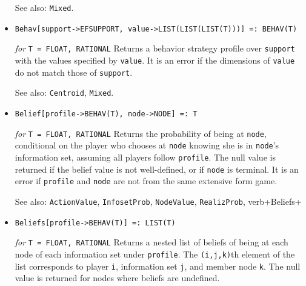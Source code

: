 \begin{itemize}
{\it for} {\tt T = FLOAT, RATIONAL}
\bd
Converts \verb+profile+ to the equivalent behavior strategy profile on the
associated extensive form game using Kuhn's Theorem.  It is an error
if there is no extensive form game associated with the normal form game
of \verb+profile+.
\item [See also:] \verb+Mixed+.
\ed

\item{}
\protect \large \begin{verbatim}
Behav[support->EFSUPPORT, value->LIST(LIST(LIST(T)))] =: BEHAV(T)
\end{verbatim}\normalsize

{\it for} {\tt T = FLOAT, RATIONAL}
\bd
Returns a behavior strategy profile over \verb+support+ with the
values specified by \verb+value+.  It is an error if the dimensions of
\verb+value+ do not match those of \verb+support+.
\item [See also:] \verb+Centroid+, \verb+Mixed+.
\ed

\item{}
\protect \large \begin{verbatim}
Belief[profile->BEHAV(T), node->NODE] =: T
\end{verbatim}\normalsize

{\it for} {\tt T = FLOAT, RATIONAL}
\bd
Returns the probability of being at \verb+node+, conditional on the
player who chooses at \verb+node+ knowing she is in \verb+node+'s
information set, assuming all players follow \verb+profile+.  The null
value is returned if the belief value is not well-defined, or if
\verb+node+ is terminal.  It is an error if \verb+profile+ and \verb+node+
are not from the same extensive form game.
\item [See also:] \verb+ActionValue+, \verb+InfosetProb+, \verb+NodeValue+,
\verb+RealizProb+, verb+Beliefs+
\ed

\item{}
\protect \large \begin{verbatim}
Beliefs[profile->BEHAV(T)] =: LIST(T)
\end{verbatim}\normalsize

{\it for} {\tt T = FLOAT, RATIONAL} 
\bd 
Returns a nested list of
beliefs of being at each node of each information set under
\verb+profile+. The \verb+(i,j,k)+th element of the list corresponds
to player \verb+i+, information set \verb+j+, and member node
\verb+k+. The null value is returned for nodes where beliefs are
undefined.


\end{itemize}
